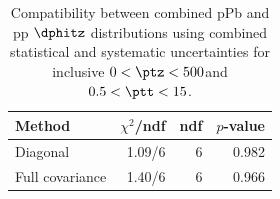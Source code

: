 \begin{table}[htp!]
\centering
\begin{tabular}{|l|r|r|r|}
\hline
Method & $\chi^2$/ndf & ndf & $p$-value \\
\hline
Diagonal & 1.09/6 & 6 & 0.982 \\
Full covariance & 1.40/6 & 6 & 0.966 \\
\hline
\end{tabular}
\caption{Compatibility between combined pPb and pp $\dphitz$ distributions using combined statistical and systematic uncertainties for inclusive $0 < \ptz < 500$\GeV and $0.5 < \ptt < 15$\GeV.}
\label{table:chisq_dphi}
\end{table}
